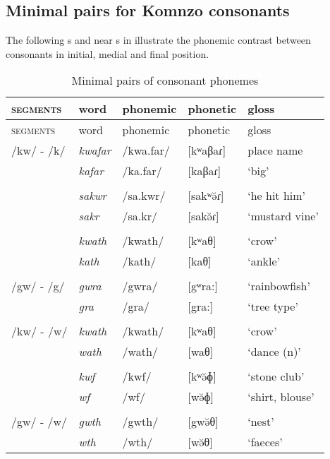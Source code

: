 \subsection{Minimal pairs for Komnzo consonants} \label{minimalpairsconsonants}

The following s and near s in  illustrate the phonemic contrast between consonants in initial, medial and final position.

\clearpage
\begin{longtable}{lllll}
\caption{Minimal pairs of consonant phonemes}
\label{minpaircon}\\
		\lsptoprule 
		\textsc{segments}& {word}& {phonemic}& {phonetic}& {gloss}\\\midrule
		\endfirsthead
 		\textsc{segments}& {word}& {phonemic}& {phonetic}& {gloss}\\\midrule
 		\endhead
		/kw/ - /k/ & \emph{kwafar} & /kwa.far/ & [kʷaβaɾ] &place name\\
		& \emph{kafar} & /ka.far/ & [kaβaɾ] &`big'\\
		&&&&\\
		& \emph{sakwr} & /sa.kwr/ & [sakʷə̆ɾ] &`he hit him'\\
		& \emph{sakr} & /sa.kr/ & [sakə̆ɾ] &`mustard vine'\\
		&&&&\\
		& \emph{kwath} & /kwath/ & [kʷaθ]&`crow'\\
		& \emph{kath} & /kath/ & [kaθ]&`ankle'\\
		&&&&\\
		/gw/ - /g/ & \emph{gwra} & /gwra/ & [{\ᵑ}gʷra:] & `rainbowfish'\\
		& \emph{gra} & /gra/ & [{\ᵑ}gra:] & `tree type'\\
		&&&&\\
		/kw/ - /w/ & \emph{kwath} & /kwath/ & [kʷaθ]&`crow'\\
		& \emph{wath} & /wath/ & [waθ]&`dance (n)'\\
		&&&&\\
		& \emph{kwf} & /kwf/ & [kʷə̆ɸ]&`stone club'\\
		& \emph{wf} & /wf/ & [wə̆ɸ]&`shirt, blouse'\\
		&&&&\\
		/gw/ - /w/ & \emph{gwth} & /gwth/ & [{\ᵑ}gwə̆θ]&`nest'\\
		& \emph{wth} & /wth/ & [wə̆θ]&`faeces'\\

\end{longtable}
